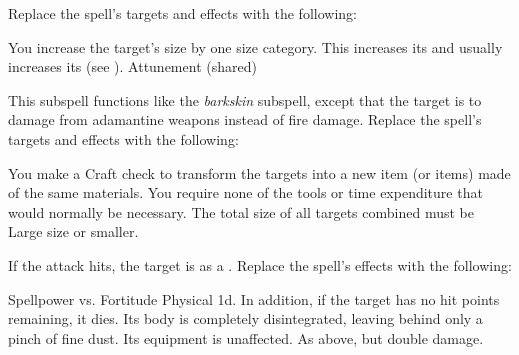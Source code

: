 Replace the spell's targets and effects with the following:
\begin{spellcontent}
\begin{augmenttargetinginfo}
\end{augmenttargetinginfo}
\begin{augmenteffects}
\spelleffect
You increase the target's size by one size category.
This increases its  and usually increases its  (see ).
\spelldur Attunement (shared)
\end{augmenteffects}
\end{spellcontent}
This subspell functions like the \textit{barkskin} subspell, except that the target is  to damage from adamantine weapons instead of fire damage.
Replace the spell's targets and effects with the following:
\begin{spellcontent}
\begin{augmenttargetinginfo}
\end{augmenttargetinginfo}
\begin{augmenteffects}
\spelleffect
You make a Craft check to transform the targets into a new item (or items) made of the same materials.
You require none of the tools or time expenditure that would normally be necessary.
The total size of all targets combined must be Large size or smaller.
\end{augmenteffects}
\end{spellcontent}
If the attack hits, the target is  as a .
Replace the spell's effects with the following:
\begin{spellcontent}
\begin{augmenteffects}
\begin{spellattack}{Spellpower vs. Fortitude}
\spellsuccess
Physical  \plus1d.
In addition, if the target has no hit points remaining, it dies.
Its body is completely disintegrated, leaving behind only a pinch of fine dust.
Its equipment is unaffected.
\spellcritical
As above, but double damage.
\end{spellattack}
\end{augmenteffects}
\end{spellcontent}
